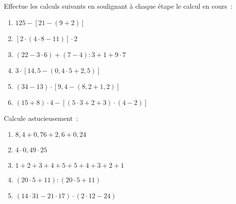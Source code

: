 \begin{exercice}
Effectue les calculs suivants en soulignant à chaque étape le calcul en cours :
\begin{enumerate}
 \item $125 - [21 - (9 + 2)]$ \dotfill	
 
 \dotfill		
 
 \dotfill
	
 \item $[2 \cdot (4 \cdot 8 - 11)] \cdot 2$ \dotfill	

 \dotfill	

 \dotfill	
	
 \item $(22 - 3 \cdot 6) + (7 - 4) : 3 + 1 + 9 \cdot 7$ \dotfill          	

 \dotfill	

 \dotfill	
 
 \dotfill		
	
 \item $3 \cdot [14,5 - (0,4 \cdot 5 + 2,5)]$ \dotfill
	
 \dotfill		

 \dotfill

 \dotfill
	
 \item $(34 - 13) \cdot [9,4 - (8,2 + 1,2)]$ \dotfill	

 \dotfill

 \dotfill

 \dotfill		
	
 \item $(15 + 8) \cdot 4 - [(5 \cdot 3 + 2 + 3) \cdot (4 - 2)]$ \dotfill
 
 \dotfill	

 \dotfill
 
 \dotfill	
 \end{enumerate}
\end{exercice}


\begin{exercice}
Calcule astucieusement :
\begin{enumerate}
 \item $8,4 + 0,76 + 2,6 + 0,24$ \dotfill
 \item $4 \cdot 0,49 \cdot 25$ \dotfill
 \item $1 + 2 + 3 + 4 + 5 + 5 + 4 + 3 + 2 + 1$ \dotfill
 \item $(20 \cdot 5 + 11) : (20 \cdot 5 + 11)$ \dotfill
 
 \dotfill
 
 \item $(14 \cdot  31 - 21 \cdot  17) \cdot  (2 \cdot  12 - 24)$ \dotfill
 
 \dotfill
 \end{enumerate}
\end{exercice}


